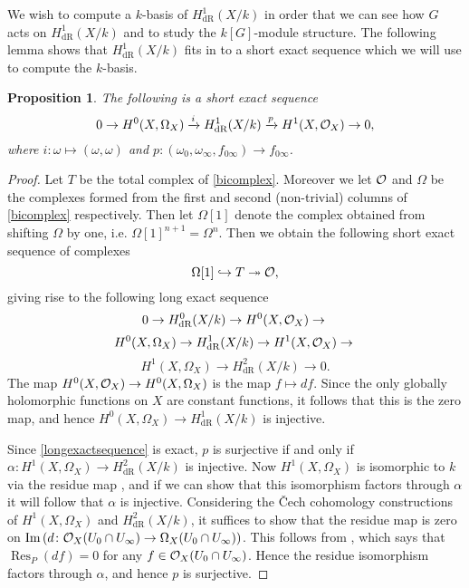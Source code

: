 \documentclass[draft, 11pt]{article} %
\theoremstyle{plain}
\newtheorem{prop}[defn]{Proposition}
\theoremstyle{remark}
\newcommand{\cO}{{\cal O}}
\newcommand{\ra}{\rightarrow}
\newcommand{\cech}{\v{C}ech }
\newcommand{\hzero}{{H^0(X,\Omega_X)}}
\newcommand{\hone}{H^1(X,\mathcal{O}_X)}
\newcommand{\derhamhone}{H_{\text {dR}}^1(X/k)}
\DeclareMathOperator{\res}{Res}
\DeclareMathOperator{\Ima}{Im}
\begin{document}
We wish to compute a $k$-basis of $\derhamhone$ in order that we can see how $G$ acts on $\derhamhone$ and to study the $k[G]$-module structure.
The following lemma shows that $\derhamhone$ fits in to a short exact sequence which we will use to compute the $k$-basis.
\begin{prop}\label{ses}
The following is a short exact sequence
\begin{equation}\label{equationses}
0 \ra H^0(X,\Omega_X) \xrightarrow{i} \derhamhone \xrightarrow{p} H^1(X,\cO_X) \ra 0, 
\end{equation}
where $i \colon \omega \mapsto (\omega, \omega)$ and $p \colon (\omega_0, \omega_\infty, f_{0 \infty}) \to f_{0 \infty}$.
\end{prop}
\begin{proof}
Let $T$ be the total complex of \eqref{bicomplex}.
Moreover we let $\cO$ and $\Omega$ be the complexes formed from the first and second (non-trivial) columns of \eqref{bicomplex} respectively.
Then let $\Omega[1]$ denote the complex obtained from shifting $\Omega$ by one, i.e. $\Omega[1]^{n+1} = \Omega^n$.
Then we obtain the following short exact sequence of complexes 
\[
\Omega[1] \hookrightarrow T \twoheadrightarrow \cO,
\]
giving rise to the following long exact sequence
\begin{equation*}
0 \ra H^0_{\text {dR}}(X/k) \ra H^0(X,\cO_X) \ra \\
\end{equation*}
\begin{equation}\label{longexactsequence}
 H^0(X,\Omega_X) \ra \derhamhone \ra \hone \ra \\
\end{equation}
\begin{equation*}
 H^1(X,\Omega_X) \ra H^2_{\text {dR}}(X/k) \ra 0.
\end{equation*}
The map $H^0(X,\cO_X) \ra \hzero$ is the map $f \mapsto df$.
Since the only globally holomorphic functions on $X$ are constant functions, it follows that this is the zero map, and hence $\hzero \ra \derhamhone$ is injective.

Since \eqref{longexactsequence} is exact, $p$ is surjective if and only if $\alpha \colon H^1(X,\Omega_X) \ra H^2_{\text {dR}}(X/k)$ is injective.
Now $H^1(X,\Omega_X)$ is isomorphic to $k$ via the residue map \cite[Chap. III, Thm. 7.14.1]{hart}, and if we can show that this isomorphism factors through $\alpha$ it will follow that $\alpha$ is injective.
Considering the \cech cohomology constructions of $H^1(X,\Omega_X)$ and $H^2_{\text {dR}}(X/k)$, it suffices to show that the residue map is zero on $\Ima \left( d \colon \cO_X(U_0 \cap U_\infty) \ra \Omega_X(U_0 \cap U_\infty) \right)$.
This follows from \cite[Chap. III, Thm. 7.14.1 (b)]{hart}, which says that $\res_P(df)=0$ for any $f \in \cO_X(U_0 \cap U_\infty)$.
Hence the residue isomorphism factors through $\alpha$, and hence $p$ is surjective.
\end{proof}
\end{document}
